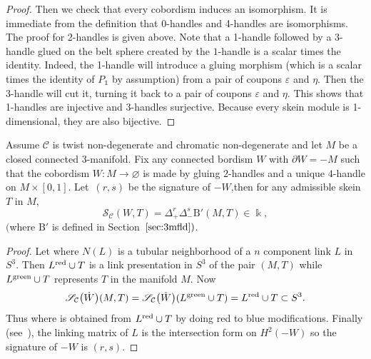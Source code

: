 \documentclass[pdftex]{sigma}
\numberwithin{equation}{section}
\numberwithin{theorem}{section}
\numberwithin{proposition}{section}
\numberwithin{definition}{section}
\numberwithin{lemma}{section}
\numberwithin{corollary}{section}
\numberwithin{remark}{section}
\numberwithin{example}{section}
\newcommand{\cat}{\mathcal{C}}
\newcommand{\unit}{\ensuremath{\mathds{1}}}
\newcommand{\FK}{{\Bbbk}}
\newcommand{\TSkein}{{\mathscr{S}}}
\newcommand{\ThreeManInv}{\mathrm{B}}
\begin{document}
\begin{proof}
Then we check that every cobordism induces an isomorphism. It is
 immediate from the definition that 0-handles and 4-handles are
 isomorphisms. The proof for 2-handles is given above. Note that a 1-handle
 followed by a 3-handle glued on the belt sphere created by the $1$-handle is a scalar times the identity. Indeed, the
 1-handle will introduce a gluing morphism (which is a scalar times
 the identity of $P_\unit$ by assumption) from a pair of coupons
 $\varepsilon$ and $\eta$. Then the 3-handle will cut it, turning it
 back to a pair of coupons $\varepsilon$ and $\eta$. This shows that
 1-handles are injective and 3-handles surjective. Because every
 skein module is 1-dimensional, they are also bijective.
\end{proof}

\begin{theorem}\label{T:4TQFT-3M}
 Assume $\cat$ is twist non-degenerate and chromatic non-degenerate
 and let $M$ be a closed connected $3$-manifold. Fix any connected
 bordism $W$ with $\partial W=-M$ such that the cobordism $W\colon M\to \varnothing$
 is made by gluing $2$-handles and a unique $4$-handle on ${M\times[0,1]}$.
 Let~$(r,s)$ be the signature of $-W$,then for any admissible skein
 $T$ in $M$,
 \begin{equation*}
 \TSkein_\cat(W,T)=\Delta_+^r\Delta_-^s\ThreeManInv'(M,T)\in\FK,
 \end{equation*}
 $($where $\ThreeManInv'$ is defined in Section~$\ref{sec:3mfld})$.
\end{theorem}
\begin{proof}
 Let
  where $N(L)$ is a
 tubular neighborhood of a $n$ component link $L$ in $S^3$. Then
 $L^{\rm red}\cup T$ is a link presentation in $S^3$ of the pair $(M,T)$
 while $L^{\rm green}\cup T$ represents $T$ in the manifold $M$. Now
 \[
 \TSkein_\cat\bigl(\dot W\bigr)(M,T)=\TSkein_\cat\bigl(\dot W\bigr)(L^{\rm green}\cup
 T)=L^{\rm red}\cup T\subset S^3.
 \]
 Thus
 \smash{$\TSkein_\cat(W,T)=F'\bigl(L^{\rm blue}\cup T\bigr)$} where  is
 obtained from $L^{\rm red}\cup T$ by doing red to blue modifications.
 Finally (see~\cite[Proposition 4.5.11]{GS99}), the linking
 matrix of $L$ is the intersection form on $H^2(-W)$ so the signature
 of $-W$ is $(r,s)$.
\end{proof}
\end{document}
